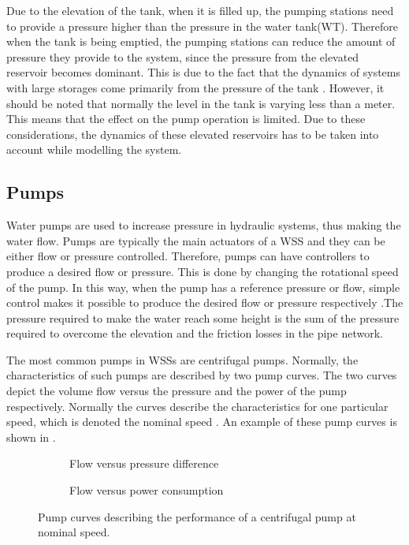Due to the elevation of the tank, when it is filled up, the pumping stations need to provide a pressure higher than the pressure in the water tank(WT). Therefore when the tank is being emptied, the pumping stations can reduce the amount of pressure they provide to the system, since the pressure from the elevated reservoir becomes dominant. This is due to the fact that the dynamics of systems with large storages come primarily from the pressure of the tank \cite{8thsemester_project}. However, it should be noted that normally the level in the tank is varying less than a meter. This means that the effect on the pump operation is limited. Due to these considerations, the dynamics of these elevated reservoirs has to be taken into account while modelling the system. 

\subsection{Pumps}
\label{pumps}

Water pumps are used to increase pressure in hydraulic systems, thus making the water flow. Pumps are typically the main actuators of a WSS and they can be either flow or pressure controlled. Therefore, pumps can have controllers to produce a desired flow or pressure. This is done by changing the rotational speed of the pump. In this way, when the pump has a reference pressure or flow, simple control makes it possible to produce the desired flow or pressure respectively \cite{kallesoePHD}.The pressure required to make the water reach some height is the sum of the pressure required to overcome the elevation and the friction losses in the pipe network. 

The most common pumps in WSSs are centrifugal pumps. Normally, the characteristics of such pumps are described by two pump curves. The two curves depict the volume flow versus the pressure and the power of the pump respectively. Normally the curves describe the characteristics for one particular speed, which is denoted the nominal speed \cite{kallesoePHD}. An example of these pump curves is shown in .

\begin{figure}[H]
\centering
\begin{subfigure}{.49\textwidth}
\centering
   
  \caption{Flow versus pressure difference}
  \label{fig:sub1}
\end{subfigure}
\begin{subfigure}{.49\textwidth}
\centering
   
  \caption{Flow versus power consumption}
  \label{fig:sub2}
\end{subfigure}
\caption{Pump curves describing the performance of a centrifugal pump at nominal speed.}
\label{fig:pump_curves}
\end{figure}

